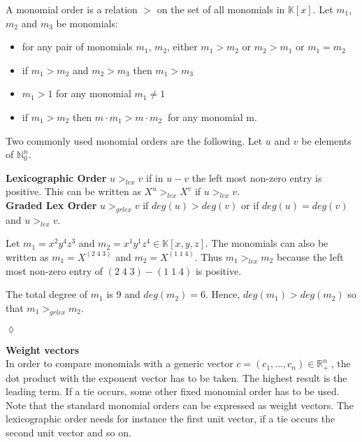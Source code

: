 \begin{env_definition} 
\cite{saleemi}
A monomial order is a relation $>$ on the set of all monomials in $\mathbb{K}\left[x\right]$.
Let $m_{1}$, $m_{2}$ and $m_{3}$ be monomials:
\begin{center}

\begin{itemize}

\item
for any pair of monomials $m_{1}$, $m_{2}$, either $m_{1} > m_{2}$ or $m_{2} > m_{1}$ or $m_{1} = m_{2}$ 
\item
if $m_{1} > m_{2} $ and $m_{2} > m_{3}$ then $m_{1} > m_{3}$
\item
$m_{1} > 1$ for any monomial $m_{1} \neq 1$
\item
if $m_{1} > m_{2}$ then $m \cdot m_{1} > m \cdot m_{2}~$ for any monomial m.

\end{itemize}
 
\end{center}

\end{env_definition}


Two commonly used monomial orders are the following.
Let $u$ and $v$ be elements of $\mathbb{N}^{n}_{0}$. 

\textbf{Lexicographic Order} \cite{saleemi}
$u >_{lex} v $ if in $u-v$ the left most non-zero entry is positive.
This can be written as $X^{u} >_{lex} X^{v}$ if $u >_{lex} v $.\\


\textbf{Graded Lex Order} \cite{saleemi}
$u >_{grlex} v $ if $ deg(u)>deg(v)$ or if $ deg(u)=deg(v)$ and $u >_{lex} v$.

\newpage
\begin{env_example} \normalfont
Let $m_{1} = x^{2}y^{4}z^{3}$ and $m_{2}= x^{1}y^{1}z^{4} \in \mathbb{K}\left[ x,y,z\right]  $.
The monomials can also be written as $m_{1} = X^{(2 \; 4 \; 3)}$ and $m_{2} = X^{(1 \; 1 \; 4)}$.
Thus $m_{1}>_{lex} m_{2}$ because the left most non-zero entry of $ (2 \; 4 \; 3) - (1 \; 1 \; 4)$ is positive.

The total degree of $m_{1}$ is 9 and $deg(m_{2})=6$. Hence, $deg(m_{1})>deg(m_{2})$ so that $m_{1}>_{grlex} m_{2}$. 
\begin{flushright}
$\lozenge$
\end{flushright}
\end{env_example}
  

\textbf{Weight vectors} \\
In order to compare monomials with a generic vector $c = \left({c}_{1},\dots ,{c}_{n}\right)\in \mathbb{R}^{n}_{+}~$, the dot product with the exponent vector has to be taken. The highest result is the leading term. If a tie occurs, some other fixed monomial order has to be used. Note that the standard monomial orders can be expressed as weight vectors. The lexicographic order needs for instance the first unit vector, if a tie occurs the second unit vector and so on.

